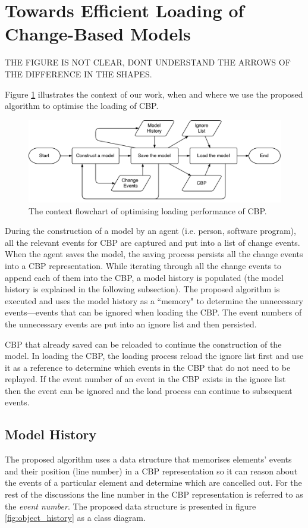 \documentclass{llncs}
\begin{document}
\section{Towards Efficient Loading of Change-Based Models}
\label{sec:loading_time_optimisation}
THE FIGURE IS NOT CLEAR, DONT UNDERSTAND THE ARROWS OF THE DIFFERENCE IN THE SHAPES.

Figure \ref{fig:flowchart} illustrates the context of our work, when and where we use the proposed algorithm to optimise the loading of CBP. 

\begin{figure}[ht]
\centering
\includegraphics[width=\linewidth]{flowchart}
\caption{The context flowchart of optimising loading performance of CBP.}
\label{fig:flowchart}
\end{figure}

During the construction of a model by an agent (i.e. person, software program), all the relevant events for CBP are captured and put into a list of change events. When the agent saves the model, the saving process persists all the change events into a CBP representation. While iterating through all the change events to append each of them into the CBP, a model history is populated (the model history is explained in the following subsection). The proposed algorithm is executed and uses the model history as a ``memory" to determine the unnecessary events---events that can be ignored when loading the CBP. The event numbers of the unnecessary events are put into an ignore list and then persisted. 

CBP that already saved can be reloaded to continue the construction of the model. In loading the CBP, the loading process reload the ignore list first and use it as a reference to determine which events in the CBP that do not need to be replayed. If the event number of an event in the CBP exists in the ignore list then the event can be ignored and the load process can continue to subsequent events. 

\subsection{Model History}
The proposed algorithm uses a data structure that memorises elements' events and their position (line number) in a CBP representation so it can reason about the events of a particular element and determine which are cancelled out.
For the rest of the discussions the line number in the CBP representation is referred to as the \emph{event number}. The proposed data structure is presented in figure \ref{fig:object_history} as a class diagram.  
\end{document}
